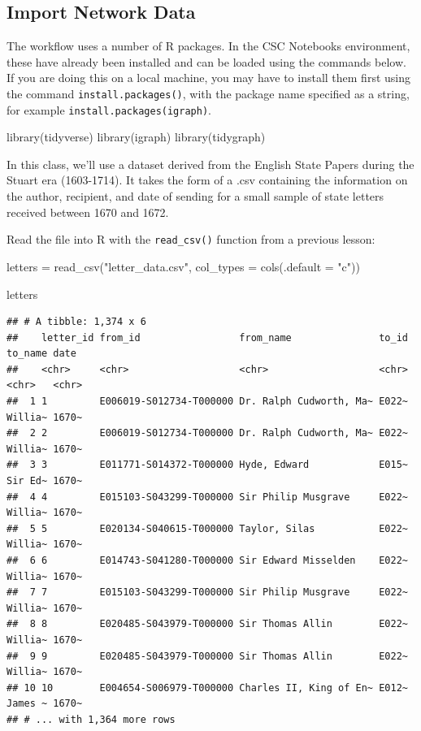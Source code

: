 \documentclass[
]{book}
\newenvironment{Shaded}{\begin{snugshade}}{\end{snugshade}}
\newcommand{\AttributeTok}[1]{\textcolor[rgb]{0.77,0.63,0.00}{#1}}
\newcommand{\FunctionTok}[1]{\textcolor[rgb]{0.00,0.00,0.00}{#1}}
\newcommand{\NormalTok}[1]{#1}
\newcommand{\OtherTok}[1]{\textcolor[rgb]{0.56,0.35,0.01}{#1}}
\newcommand{\StringTok}[1]{\textcolor[rgb]{0.31,0.60,0.02}{#1}}
\begin{document}
\hypertarget{import-network-data}{%
\subsection{Import Network Data}\label{import-network-data}}

The workflow uses a number of R packages. In the CSC Notebooks environment, these have already been installed and can be loaded using the commands below. If you are doing this on a local machine, you may have to install them first using the command \texttt{install.packages()}, with the package name specified as a string, for example \texttt{install.packages(\textquotesingle{}igraph\textquotesingle{})}.

\begin{Shaded}
\begin{Highlighting}[]
\FunctionTok{library}\NormalTok{(tidyverse)}
\FunctionTok{library}\NormalTok{(igraph)}
\FunctionTok{library}\NormalTok{(tidygraph)}
\end{Highlighting}
\end{Shaded}

In this class, we'll use a dataset derived from the English State Papers during the Stuart era (1603-1714). It takes the form of a .csv containing the information on the author, recipient, and date of sending for a small sample of state letters received between 1670 and 1672.

Read the file into R with the \texttt{read\_csv()} function from a previous lesson:

\begin{Shaded}
\begin{Highlighting}[]
\NormalTok{letters }\OtherTok{=} \FunctionTok{read\_csv}\NormalTok{(}\StringTok{"letter\_data.csv"}\NormalTok{, }\AttributeTok{col\_types =} \FunctionTok{cols}\NormalTok{(}\AttributeTok{.default =} \StringTok{"c"}\NormalTok{))}

\NormalTok{letters}
\end{Highlighting}
\end{Shaded}

\begin{verbatim}
## # A tibble: 1,374 x 6
##    letter_id from_id                 from_name               to_id to_name date 
##    <chr>     <chr>                   <chr>                   <chr> <chr>   <chr>
##  1 1         E006019-S012734-T000000 Dr. Ralph Cudworth, Ma~ E022~ Willia~ 1670~
##  2 2         E006019-S012734-T000000 Dr. Ralph Cudworth, Ma~ E022~ Willia~ 1670~
##  3 3         E011771-S014372-T000000 Hyde, Edward            E015~ Sir Ed~ 1670~
##  4 4         E015103-S043299-T000000 Sir Philip Musgrave     E022~ Willia~ 1670~
##  5 5         E020134-S040615-T000000 Taylor, Silas           E022~ Willia~ 1670~
##  6 6         E014743-S041280-T000000 Sir Edward Misselden    E022~ Willia~ 1670~
##  7 7         E015103-S043299-T000000 Sir Philip Musgrave     E022~ Willia~ 1670~
##  8 8         E020485-S043979-T000000 Sir Thomas Allin        E022~ Willia~ 1670~
##  9 9         E020485-S043979-T000000 Sir Thomas Allin        E022~ Willia~ 1670~
## 10 10        E004654-S006979-T000000 Charles II, King of En~ E012~ James ~ 1670~
## # ... with 1,364 more rows
\end{verbatim}
\end{document}

